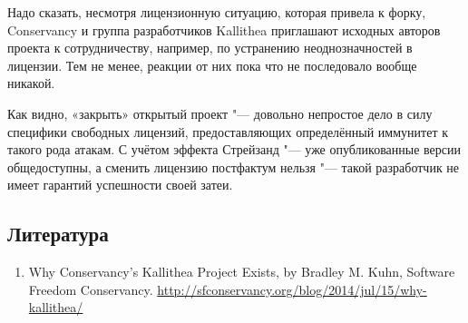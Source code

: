 \documentclass[10pt, a5paper]{article}
\begin{document}
Надо сказать, несмотря лицензионную ситуацию, которая привела к форку, Conservancy и группа разработчиков Kallithea приглашают исходных авторов проекта к сотрудничеству, например, по устранению неоднозначностей в лицензии. Тем не менее, реакции от них пока что не последовало вообще никакой.

Как видно, «закрыть» открытый проект "--- довольно непростое дело в силу специфики свободных лицензий, предоставляющих \linebreak определённый иммунитет к такого рода атакам. С учётом эффекта Стрейзанд "--- уже опубликованные версии общедоступны, а сменить лицензию постфактум нельзя "--- такой разработчик не имеет гарантий успешности своей затеи.

\subsection*{Литература}
\begin{enumerate}
\item Why Conservancy's Kallithea Project Exists, by Bradley M. Kuhn, Software Freedom Conservancy. \url{http://sfconservancy.org/blog/2014/jul/15/why-kallithea/}
\end{enumerate}
\end{document}
